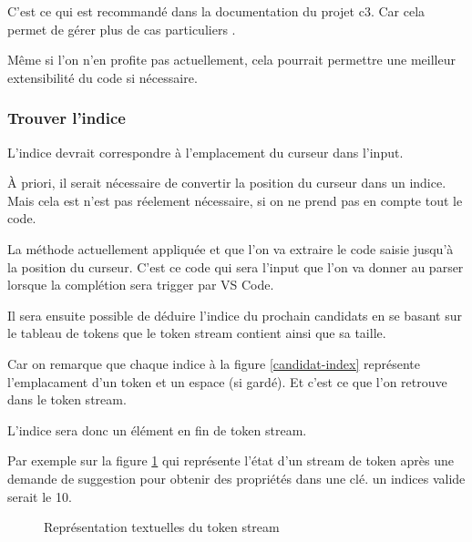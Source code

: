 \documentclass[
    iict, %
    il, %
]{heig-tb}
\begin{document}
C'est ce qui est recommandé dans la documentation du projet c3. Car cela permet de gérer plus de cas particuliers \cite{c3-example-soql}.

Même si l'on n'en profite pas actuellement, cela pourrait permettre une meilleur extensibilité du code si nécessaire.


\subsubsection{Trouver l'indice}

L'indice devrait correspondre à l'emplacement du curseur dans l'input.

À priori, il serait nécessaire de convertir la position du curseur dans un indice.
Mais cela est n'est pas réelement nécessaire, si on ne prend pas en compte tout le code.

La méthode actuellement appliquée et que l'on va extraire le code saisie jusqu'à la position du curseur.
C'est ce code qui sera l'input que l'on va donner au parser lorsque la complétion sera trigger par VS Code.

Il sera ensuite possible de déduire l'indice du prochain candidats en se basant sur le tableau de tokens que le token stream contient ainsi que sa taille.

Car on remarque que chaque indice à la figure \ref{candidat-index} représente l'emplacament d'un token et un espace (si gardé). Et c'est ce que l'on retrouve dans le token stream.

L'indice sera donc un élément en fin de token stream.

Par exemple sur la figure \ref{token-stream} qui représente l'état d'un stream de token après une demande de suggestion pour obtenir des propriétés dans une clé.
un indices valide serait le 10.

\begin{figure}[!h]
    \begin{center}
    \end{center}
    \caption[Représentation textuelles du token stream]{\label{token-stream} Représentation textuelles du token stream}
\end{figure}
\end{document}
